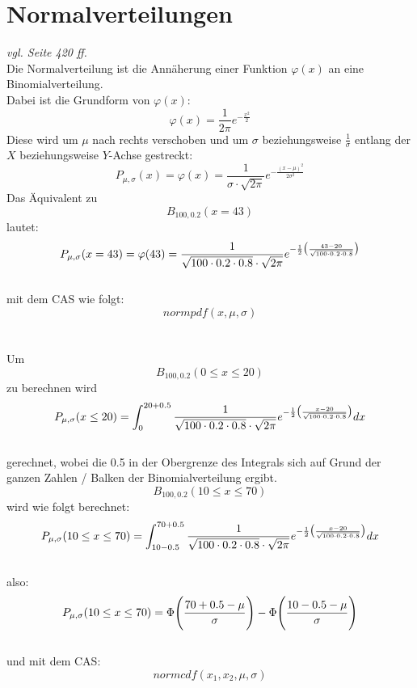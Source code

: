 \documentclass[a4paper,12pt]{article}
\begin{document}
\section{Normalverteilungen}
\textit{vgl. Seite 420 ff.}\\
Die Normalverteilung ist die Annäherung einer Funktion $\varphi(x)$ an eine Binomialverteilung.\\
Dabei ist die Grundform von $\varphi(x)$:
$$\varphi(x) = \frac{1}{2 \pi} e^{- \frac{x^2}{2}}$$
Diese wird um $\mu$ nach rechts verschoben und um $\sigma$ beziehungsweise $\frac{1}{\sigma}$ entlang der $X$ beziehungsweise $Y$-Achse gestreckt:
$$P_{\mu, \sigma}(x) = \varphi(x) = \frac{1}{\sigma \cdot  \sqrt{2 \pi}} e^{-\frac{(x - \mu)^{2}}{2 \sigma^{2}}}$$
Das Äquivalent zu
$$B_{100, 0.2}(x = 43)$$
lautet:\\
$$P_{\mu, \sigma}(x = 43) = \varphi(43) = \frac{1}{\sqrt{100 \cdot 0.2 \cdot 0.8} \cdot  \sqrt{2 \pi}} e^{-\frac{1}{2} \big{(}\frac{43 - 20}{\sqrt{100 \cdot 0.2 \cdot 0.8}}\big{)}}$$
\\mit dem CAS wie folgt:
$$normpdf(x, \mu, \sigma)$$
\\
\pagebreak
\\Um
$$B_{100, 0.2}(0 \leq x \leq 20)$$
zu berechnen wird\\
$$P_{\mu, \sigma}(x \leq 20) = \int_{0}^{20 + 0.5} \frac{1}{\sqrt{100 \cdot 0.2 \cdot 0.8} \cdot  \sqrt{2 \pi}} e^{-\frac{1}{2} \big{(}\frac{x - 20}{\sqrt{100 \cdot 0.2 \cdot 0.8}}\big{)}} dx$$
\\gerechnet, wobei die 0.5 in der Obergrenze des Integrals sich auf Grund der ganzen Zahlen / Balken der Binomialverteilung ergibt.\\
$$B_{100, 0.2}(10 \leq x \leq 70)$$
wird wie folgt berechnet:\\
$$P_{\mu, \sigma}(10 \leq x \leq 70) = \int_{10 - 0.5}^{70 + 0.5} \frac{1}{\sqrt{100 \cdot 0.2 \cdot 0.8} \cdot  \sqrt{2 \pi}} e^{-\frac{1}{2} \big{(}\frac{x - 20}{\sqrt{100 \cdot 0.2 \cdot 0.8}}\big{)}} dx$$
\\also:\\
$$P_{\mu, \sigma}(10 \leq x \leq 70) = \Phi\Bigg{(}\frac{70 + 0.5 - \mu}{\sigma}\Bigg{)} - \Phi\Bigg{(}\frac{10 - 0.5 - \mu}{\sigma}\Bigg{)}$$
\\und mit dem CAS:
$$normcdf(x_1, x_2, \mu, \sigma)$$
\pagebreak
\end{document}
